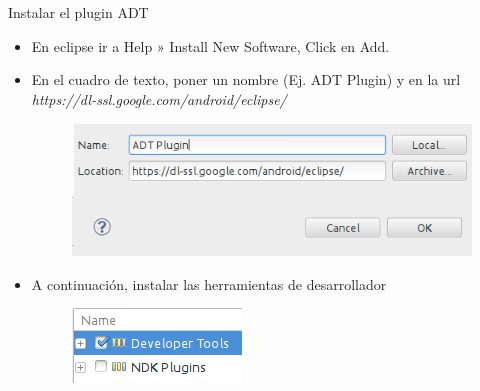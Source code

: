 \documentclass{beamer}
\begin{document}
\begin{frame}{Instalar el plugin ADT}{}
  \begin{itemize}
  \item {
    En eclipse ir a Help » Install New Software, Click en Add.
  }
  \item {
    En el cuadro de texto, poner un nombre (Ej. ADT Plugin) y en la url \textit{https://dl-ssl.google.com/android/eclipse/}
  }

    \begin{figure}[h]
        \centering
        \includegraphics[scale=.5]{./img/adt.png}
    \end{figure}

    \item{A continuación, instalar las herramientas de desarrollador}

    \begin{figure}[H]
    \centering
    \includegraphics[scale=.4]{./img/dt.png}
    \end{figure}

  \end{itemize}
\end{frame}
\end{document}
